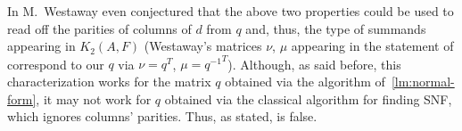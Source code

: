 \documentclass[oneside, 10pt]{amsart}
\theoremstyle{plain}
\theoremstyle{remark}
\theoremstyle{definition}
\newtheorem{example}[lemma]{Example} \Crefname{example}{Example}{Examples}
\DeclareMathOperator{\E}{E}
\newcommand{\ZZ}{\mathbb{Z}}
\newcommand{\K}{K_2}
\begin{document}
In \cite{MW} M.~Westaway even conjectured that the above two properties could be used to read off the parities of columns of $d$ from $q$ and,
 thus, the type of summands appearing in $\K(A, F)$
 (Westaway's matrices $\nu$, $\mu$ appearing in the statement of \cite[Conjecture~9.1]{MW} correspond to our $q$ via $\nu = q^T$, $\mu = {q^{-1}}^T$).
Although, as said before, this characterization works for the matrix $q$ obtained via the algorithm of~\cref{lm:normal-form},
 it may not work for $q$ obtained via the classical algorithm for finding SNF, which ignores columns' parities.
Thus, as stated, \cite[Conjecture~9.1]{MW} is false.
\begin{comment}
\begin{example}
To produce a counterexample, start from GCM 
 $A = \left(\begin{smallmatrix}
 2& -3& -2& 0\\
-1& 2& -2& 0\\
-2& -2& 2& -4\\
0& 0& -4& 2\end{smallmatrix}\right)$
  and write SNF decomposition of~\cref{lm:normal-form} for $\widetilde{A}$
\[\widetilde{A} = \left(\begin{smallmatrix}
-1& 3& 0& 0\\
-2& 0& 2& 0\\
0& 0& 0& 0\\
0& -2& 2& 0\\
0& 0& 0& 0\\
0& 0& -4& 4
\end{smallmatrix} \right) = \left(\begin{smallmatrix}
1& 0& 0& 0& 0& 0\\
2& 1& 0& 0& 0& 0\\
0& 0& 0& 0& 1& 0\\
0& 1& 0& 1& 0& 0\\
0& 0& 0& 0& 0& 1\\
0& -2& 1& 0& 0& 0\end{smallmatrix}\right) \cdot \mathrm{diag}(-1,2,4,4) \cdot \left(\begin{smallmatrix}
1& -3& 0& 0\\
0& -3& 1& 0\\
0& -3& 0& 1\\
0& 1& 0& 0\\ \end{smallmatrix}\right) = p \cdot d \cdot q.\]
Looking at the last 2 columns of $q$ we deduce that columns with $1$st and $4$th columns of $d$ are odd while $2$nd and $3$rd are even.
Now take $s = t_{43}(1) \in \E(4, \ZZ)$, $t = t_{43}(-1) \ in \E(6, \ZZ)$.
Notice that the central factor in the decomposition $\widetilde{A} = (p t) \cdot (t^{-1} d s^{-1}) \cdot (s q)$ is still 
 a still diagonal matrix but neither of the above two criterions is applicable to the matrix $sq$.
\end{example}
\end{comment}
\printbibliography
\end{document}
